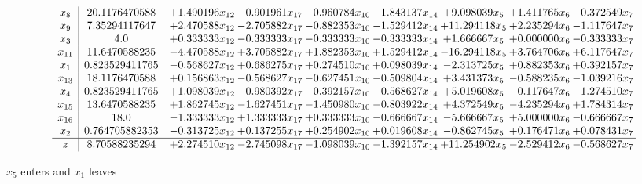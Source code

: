 \documentclass[10pt]{article}
\begin{document}
 \[\begin{array}{c| c c@{\hskip 2pt} c@{\hskip 2pt} c@{\hskip 2pt} c@{\hskip 2pt} c@{\hskip 2pt} c@{\hskip 2pt} c@{\hskip 2pt} }
 x_{8}   &  20.1176470588 & + 1.490196 x_{12} & -0.901961 x_{17} & -0.960784 x_{10} & -1.843137 x_{14} & + 9.098039 x_{5} & + 1.411765 x_{6} & -0.372549 x_{7}\\
 x_{9}   &  7.35294117647 & + 2.470588 x_{12} & -2.705882 x_{17} & -0.882353 x_{10} & -1.529412 x_{14} & + 11.294118 x_{5} & + 2.235294 x_{6} & -1.117647 x_{7}\\
 x_{3}   &  4.0 & + 0.333333 x_{12} & -0.333333 x_{17} & -0.333333 x_{10} & -0.333333 x_{14} & + 1.666667 x_{5} & + 0.000000 x_{6} & -0.333333 x_{7}\\
 x_{11}   &  11.6470588235 & -4.470588 x_{12} & + 3.705882 x_{17} & + 1.882353 x_{10} & + 1.529412 x_{14} & -16.294118 x_{5} & + 3.764706 x_{6} & + 6.117647 x_{7}\\
 x_{1}   &  0.823529411765 & -0.568627 x_{12} & + 0.686275 x_{17} & + 0.274510 x_{10} & + 0.098039 x_{14} & -2.313725 x_{5} & + 0.882353 x_{6} & + 0.392157 x_{7}\\
 x_{13}   &  18.1176470588 & + 0.156863 x_{12} & -0.568627 x_{17} & -0.627451 x_{10} & -0.509804 x_{14} & + 3.431373 x_{5} & -0.588235 x_{6} & -1.039216 x_{7}\\
 x_{4}   &  0.823529411765 & + 1.098039 x_{12} & -0.980392 x_{17} & -0.392157 x_{10} & -0.568627 x_{14} & + 5.019608 x_{5} & -0.117647 x_{6} & -1.274510 x_{7}\\
 x_{15}   &  13.6470588235 & + 1.862745 x_{12} & -1.627451 x_{17} & -1.450980 x_{10} & -0.803922 x_{14} & + 4.372549 x_{5} & -4.235294 x_{6} & + 1.784314 x_{7}\\
 x_{16}   &  18.0 & -1.333333 x_{12} & + 1.333333 x_{17} & + 0.333333 x_{10} & -0.666667 x_{14} & -5.666667 x_{5} & + 5.000000 x_{6} & -0.666667 x_{7}\\
 x_{2}   &  0.764705882353 & -0.313725 x_{12} & + 0.137255 x_{17} & + 0.254902 x_{10} & + 0.019608 x_{14} & -0.862745 x_{5} & + 0.176471 x_{6} & + 0.078431 x_{7}\\
\hline
z    &  8.70588235294 & + 2.274510 x_{12} & -2.745098 x_{17} & -1.098039 x_{10} & -1.392157 x_{14} & + 11.254902 x_{5} & -2.529412 x_{6} & -0.568627 x_{7}\\
\end{array}\]


 $ x_{5} $ enters and $ x_{1} $ leaves 
\end{document}
